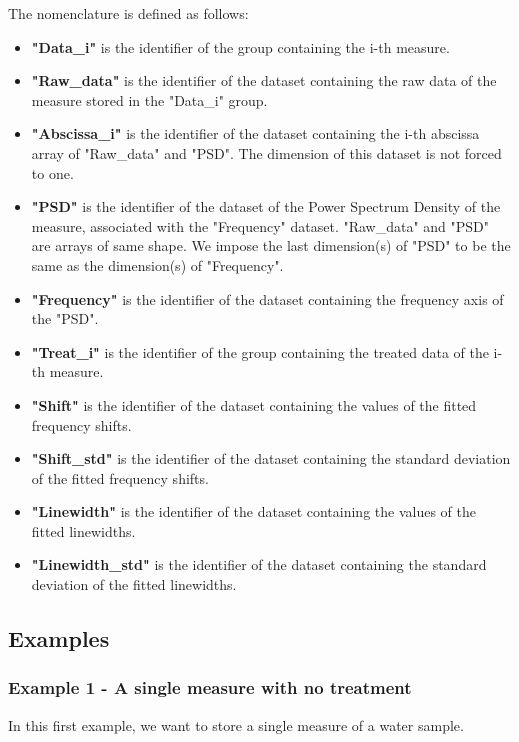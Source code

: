 \documentclass{article}
\begin{document}
        The nomenclature is defined as follows:
        \begin{itemize}
            \item \textbf{"Data\_i"} is the identifier of the group containing the i-th measure.
            \item \textbf{"Raw\_data"} is the identifier of the dataset containing the raw data of the measure stored in the "Data\_i" group.
            \item \textbf{"Abscissa\_i"} is the identifier of the dataset containing the i-th abscissa array of "Raw\_data" and "PSD". The dimension of this dataset is not forced to one.
            \item \textbf{"PSD"} is the identifier of the dataset of the Power Spectrum Density of the measure, associated with the "Frequency" dataset. "Raw\_data" and "PSD" are arrays of same shape. We impose the last dimension(s) of "PSD" to be the same as the dimension(s) of "Frequency".
            \item \textbf{"Frequency"} is the identifier of the dataset containing the frequency axis of the "PSD".
            \item \textbf{"Treat\_i"} is the identifier of the group containing the treated data of the i-th measure.
            \item \textbf{"Shift"} is the identifier of the dataset containing the values of the fitted frequency shifts.
            \item \textbf{"Shift\_std"} is the identifier of the dataset containing the standard deviation of the fitted frequency shifts.
            \item \textbf{"Linewidth"} is the identifier of the dataset containing the values of the fitted linewidths.
            \item \textbf{"Linewidth\_std"} is the identifier of the dataset containing the standard deviation of the fitted linewidths.  
        \end{itemize}
        
    \subsection{Examples}
        
        \subsubsection{Example 1 - A single measure with no treatment}
            In this first example, we want to store a single measure of a water sample.
        
\end{document}
